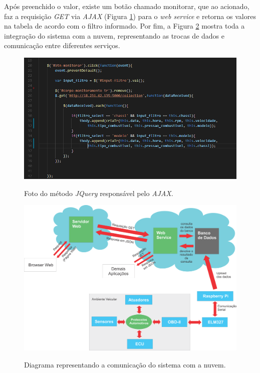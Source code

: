 Após preenchido o valor, existe um botão chamado monitorar, que ao acionado, faz a requisição \textit{GET} via \textit{AJAX} (Figura \ref{Fig:requisicao_ajax}) para o \textit{web service} e retorna os valores na tabela de acordo com o filtro informado.
Por fim, a Figura \ref{Fig:arquitetura_projeto} mostra toda a integração do sistema com a nuvem, representando as trocas de dados e comunicação entre diferentes serviços.

\begin{figure}[!ht]
\centering
\caption{Foto do método \textit{JQuery} responsável pelo \textit{AJAX}.} 
{\includegraphics[scale=.64]{imagens/requisicaoAjax.png}}\\
 \label{Fig:requisicao_ajax}
\end{figure}

\begin{figure}[!ht]
\centering
\caption{Diagrama representando a comunicação do sistema com a nuvem.} 
{\includegraphics[scale=.38]{imagens/arquiteturaRedeVeicularELM327Nuvem.png}}\\
 \label{Fig:arquitetura_projeto}
\end{figure}
